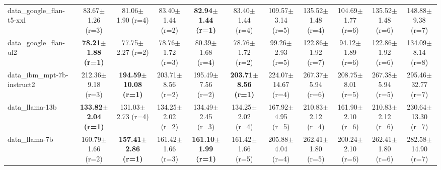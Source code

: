 \begin{table}[t]
\begin{tabular}{lcccccccccc}
data\_google\_flan-t5-xxl & 83.67$\pm$1.26 {\scriptsize (r=3)} & 81.06$\pm$1.90 {\scriptsize (r=4)} & 83.40$\pm$1.44 {\scriptsize (r=2)} & \cellcolor{red!15}\textbf{82.94$\pm$1.44 {\scriptsize (r=1)}} & 83.40$\pm$1.44 {\scriptsize (r=4)} & 109.57$\pm$3.14 {\scriptsize (r=5)} & 135.52$\pm$1.48 {\scriptsize (r=4)} & 104.69$\pm$1.77 {\scriptsize (r=6)} & 135.52$\pm$1.48 {\scriptsize (r=6)} & 148.88$\pm$9.38 {\scriptsize (r=7)} \\
data\_google\_flan-ul2 & \cellcolor{red!15}\textbf{78.21$\pm$1.88 {\scriptsize (r=1)}} & 77.75$\pm$2.27 {\scriptsize (r=2)} & 78.76$\pm$1.72 {\scriptsize (r=3)} & 80.39$\pm$1.68 {\scriptsize (r=4)} & 78.76$\pm$1.72 {\scriptsize (r=2)} & 99.26$\pm$2.93 {\scriptsize (r=5)} & 122.86$\pm$1.92 {\scriptsize (r=7)} & 94.12$\pm$1.89 {\scriptsize (r=6)} & 122.86$\pm$1.92 {\scriptsize (r=6)} & 134.09$\pm$8.14 {\scriptsize (r=8)} \\
data\_ibm\_mpt-7b-instruct2 & 212.36$\pm$9.18 {\scriptsize (r=3)} & \cellcolor{red!15}\textbf{194.59$\pm$10.08 {\scriptsize (r=1)}} & 203.71$\pm$8.56 {\scriptsize (r=2)} & 195.49$\pm$7.56 {\scriptsize (r=2)} & \cellcolor{red!15}\textbf{203.71$\pm$8.56 {\scriptsize (r=1)}} & 224.07$\pm$14.67 {\scriptsize (r=4)} & 267.37$\pm$5.94 {\scriptsize (r=6)} & 208.75$\pm$8.01 {\scriptsize (r=5)} & 267.38$\pm$5.94 {\scriptsize (r=5)} & 295.46$\pm$32.77 {\scriptsize (r=7)} \\
data\_llama-13b & \cellcolor{red!15}\textbf{133.82$\pm$2.04 {\scriptsize (r=1)}} & 131.03$\pm$2.73 {\scriptsize (r=4)} & 134.25$\pm$2.02 {\scriptsize (r=2)} & 134.49$\pm$2.45 {\scriptsize (r=3)} & 134.25$\pm$2.02 {\scriptsize (r=4)} & 167.92$\pm$4.95 {\scriptsize (r=5)} & 210.83$\pm$2.12 {\scriptsize (r=4)} & 161.90$\pm$2.10 {\scriptsize (r=6)} & 210.83$\pm$2.12 {\scriptsize (r=6)} & 230.64$\pm$13.30 {\scriptsize (r=7)} \\
data\_llama-7b & 160.79$\pm$1.66 {\scriptsize (r=2)} & \cellcolor{red!15}\textbf{157.41$\pm$2.86 {\scriptsize (r=1)}} & 161.42$\pm$1.66 {\scriptsize (r=3)} & \cellcolor{red!15}\textbf{161.10$\pm$1.99 {\scriptsize (r=1)}} & 161.42$\pm$1.66 {\scriptsize (r=5)} & 205.88$\pm$4.04 {\scriptsize (r=4)} & 262.41$\pm$1.80 {\scriptsize (r=5)} & 200.24$\pm$2.10 {\scriptsize (r=6)} & 262.41$\pm$1.80 {\scriptsize (r=6)} & 282.58$\pm$14.90 {\scriptsize (r=7)} \\
\bottomrule
\end{tabular}
\end{table}